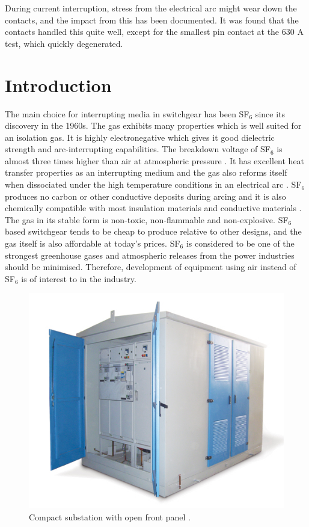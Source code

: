 \documentclass[10pt,a4paper,twoside]{article}
\begin{document}
During current interruption, stress from the electrical arc might wear down the contacts, and the impact from this has been documented. It was found that the contacts handled this quite well, except for the smallest pin contact at the 630 A test, which quickly degenerated.


\cleardoublepage
\setcounter{page}{1}
\tableofcontents
\cleardoublepage

\section{Introduction}
The main choice for interrupting media in switchgear has been SF$_6$ since its discovery in the 1960s. The gas exhibits many properties which is well suited for an isolation gas. It is highly electronegative which gives it good dielectric strength and arc-interrupting capabilities. The breakdown voltage of SF$_6$ is almost three times higher than air at atmospheric pressure \cite{bib:SF6PI}. It has excellent heat transfer properties as an interrupting medium and the gas also reforms itself when dissociated under the high temperature conditions in an electrical arc  \cite{bib:SF6PI}. SF$_6$ produces no carbon or other conductive deposits during arcing and it is also chemically compatible with most insulation materials and conductive materials \cite{bib:SF6PI}. The gas in its stable form is non-toxic, non-flammable and non-explosive. SF$_6$ based switchgear tends to be cheap to produce relative to other designs, and the gas itself is also affordable at today's prices. SF$_6$ is considered to be one of the strongest greenhouse gases and atmospheric releases from the power industries should be minimised. Therefore, development of equipment using air instead of SF$_6$ is of interest to in the industry.

\begin{figure} [h]
\centering
\includegraphics[scale=0.5]{Bilder/Introduction/general_substation.jpg}
\caption{Compact substation with open front panel \cite{bib:comSub}.} \label{fig:compact substation}
\end{figure}
\end{document}
